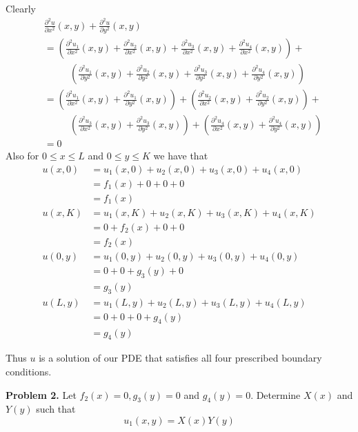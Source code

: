 \documentclass[12pt]{article}
\newcommand{\problem}[1]{\hspace{-4 ex} \large \textbf{Problem #1} }
\begin{document}
Clearly
\begin{align*}
	& \frac{\partial^2 u}{\partial x^2}(x,y) + \frac{\partial^2 u}{\partial y^2}(x,y) \\
	& = \left( \frac{\partial^2 u_1}{\partial x^2}(x,y) + \frac{\partial^2 u_2}{\partial x^2}(x,y) 
	+ \frac{\partial^2 u_3}{\partial x^2}(x,y) + \frac{\partial^2 u_4}{\partial x^2}(x,y) \right) + \\
	& \phantom{==} \left( \frac{\partial^2 u_1}{\partial y^2}(x,y) + \frac{\partial^2 u_2}{\partial y^2}(x,y)
	+ \frac{\partial^2 u_3}{\partial y^2}(x,y) + \frac{\partial^2 u_4}{\partial y^2}(x,y) \right) \\
	& = \left( \frac{\partial^2 u_1}{\partial x^2}(x,y) + \frac{\partial^2 u_1}{\partial y^2}(x,y) \right) + 
	\left( \frac{\partial^2 u_2}{\partial x^2}(x,y) + \frac{\partial^2 u_2}{\partial y^2}(x,y) \right) + \\
	&\phantom{==} \left( \frac{\partial^2 u_3}{\partial x^2}(x,y) + \frac{\partial^2 u_3}{\partial y^2}(x,y) \right) +
	\left( \frac{\partial^2 u_4}{\partial x^2}(x,y) + \frac{\partial^2 u_4}{\partial y^2}(x,y) \right) \\
	& = 0
\end{align*}
Also for $ 0 \leq x \leq L$ and $0 \leq y \leq K$ we have that
\begin{align*}
	u(x,0) & = u_1(x,0) + u_2(x,0) + u_3(x,0) + u_4(x,0) \\
	& = f_1(x) + 0 + 0 + 0 \\
	& = f_1(x) \\
	u(x,K) & = u_1(x,K) + u_2(x,K) + u_3(x,K) + u_4(x,K) \\
	& = 0 + f_2(x) + 0 + 0 \\
	& = f_2(x) \\
	u(0,y) & = u_1(0,y) + u_2(0,y) + u_3(0,y) + u_4(0,y) \\
	& = 0 + 0 + g_3(y) + 0 \\
	& = g_3(y) \\
	u(L,y) & = u_1(L,y) + u_2(L,y) + u_3(L,y) + u_4(L,y) \\
	& = 0 + 0 + 0 + g_4(y) \\
	& = g_4(y)
\end{align*}

Thus $u$ is a solution of our PDE that satisfies all four prescribed boundary conditions. \bigbreak

\problem{2. } Let $f_2(x)=0, g_3(y)=0$ and $g_4(y)=0$. Determine $X(x)$ and $Y(y)$ such that
$$
u_1(x,y) = X(x)Y(y)
$$
\bigbreak
\end{document}
